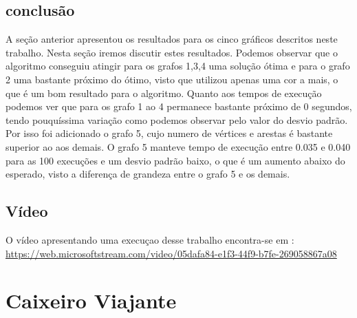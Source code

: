 \documentclass[12pt,openright,oneside,a4paper,brazil]{abntex2}
\begin{document}
\section{conclusão}
A seção anterior apresentou os resultados para os cinco gráficos descritos neste trabalho. Nesta seção iremos discutir estes resultados. Podemos observar que o algoritmo conseguiu atingir para os grafos 1,3,4 uma solução ótima e para o grafo 2 uma  bastante próximo do ótimo, visto que utilizou apenas uma cor a mais, o que é um bom resultado para o algoritmo. 
Quanto aos tempos de execução podemos ver que para os grafo 1 ao 4 permanece bastante próximo de 0 segundos, tendo pouquíssima variação como podemos observar pelo valor do desvio padrão. Por isso foi adicionado o grafo 5, cujo numero de vértices e arestas é bastante superior ao aos demais. O grafo 5 manteve tempo de execução entre 0.035 e 0.040 para as 100 execuções e um desvio padrão baixo, o que é um aumento abaixo do esperado, visto a diferença de grandeza entre o grafo 5 e os demais.

\section{Vídeo}
O vídeo apresentando uma execuçao desse trabalho encontra-se em : \url{https://web.microsoftstream.com/video/05dafa84-e1f3-44f9-b7fe-269058867a08}

\chapter{Caixeiro Viajante}    
\end{document}
